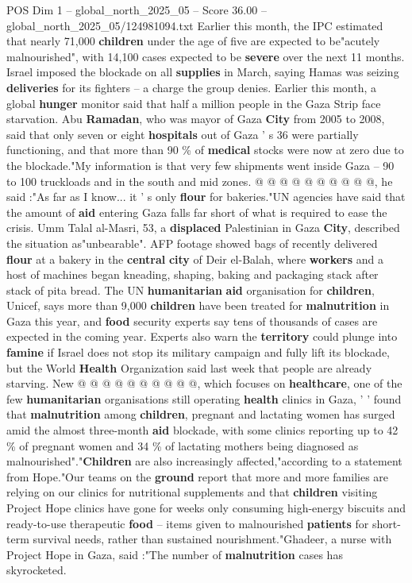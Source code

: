 \begin{textsample}{POS Dim 1 – global\_north\_2025\_05 – Score 36.00 – global\_north\_2025\_05/124981094.txt}
Earlier this month, the IPC estimated that nearly 71,000 \textbf{children} under the age of five are expected to be"acutely malnourished", with 14,100 cases expected to be \textbf{severe} over the next 11 months.
Israel imposed the blockade on all \textbf{supplies} in March, saying Hamas was seizing \textbf{deliveries} for its fighters -- a charge the group denies.
Earlier this month, a global \textbf{hunger} monitor said that half a million people in the Gaza Strip face starvation.
Abu \textbf{Ramadan}, who was mayor of Gaza \textbf{City} from 2005 to 2008, said that only seven or eight \textbf{hospitals} out of Gaza ' s 36 were partially functioning, and that more than 90 \% of \textbf{medical} stocks were now at zero due to the blockade."My information is that very few shipments went inside Gaza -- 90 to 100 truckloads and in the south and mid zones. @ @ @ @ @ @ @ @ @ @, he said :"As far as I know... it ' s only \textbf{flour} for bakeries."UN agencies have said that the amount of \textbf{aid} entering Gaza falls far short of what is required to ease the crisis.
Umm Talal al-Masri, 53, a \textbf{displaced} Palestinian in Gaza \textbf{City}, described the situation as"unbearable".
AFP footage showed bags of recently delivered \textbf{flour} at a bakery in the \textbf{central} \textbf{city} of Deir el-Balah, where \textbf{workers} and a host of machines began kneading, shaping, baking and packaging stack after stack of pita bread.
The UN \textbf{humanitarian} \textbf{aid} organisation for \textbf{children}, Unicef, says more than 9,000 \textbf{children} have been treated for \textbf{malnutrition} in Gaza this year, and \textbf{food} security experts say tens of thousands of cases are expected in the coming year.
Experts also warn the \textbf{territory} could plunge into \textbf{famine} if Israel does not stop its military campaign and fully lift its blockade, but the World \textbf{Health} Organization said last week that people are already starving.
New @ @ @ @ @ @ @ @ @ @, which focuses on \textbf{healthcare}, one of the few \textbf{humanitarian} organisations still operating \textbf{health} clinics in Gaza, ' ' found that \textbf{malnutrition} among \textbf{children}, pregnant and lactating women has surged amid the almost three-month \textbf{aid} blockade, with some clinics reporting up to 42 \% of pregnant women and 34 \% of lactating mothers being diagnosed as malnourished"."\textbf{Children} are also increasingly affected,"according to a statement from Hope."Our teams on the \textbf{ground} report that more and more families are relying on our clinics for nutritional supplements and that \textbf{children} visiting Project Hope clinics have gone for weeks only consuming high-energy biscuits and ready-to-use therapeutic \textbf{food} -- items given to malnourished \textbf{patients} for short-term survival needs, rather than sustained nourishment."Ghadeer, a nurse with Project Hope in Gaza, said :"The number of \textbf{malnutrition} cases has skyrocketed.

\end{textsample}
